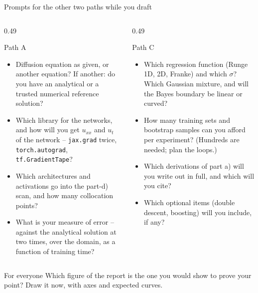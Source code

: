 \documentclass[10pt,aspectratio=169]{beamer}
\begin{document}
\begin{frame}{Prompts for the other two paths while you draft}
\footnotesize
\begin{columns}[T]
\begin{column}{0.49\textwidth}
\begin{block}{Path A}
\begin{itemize}
  \item Diffusion equation as given, or another equation?  If another: do
        you have an analytical or a trusted numerical reference solution?
  \item Which library for the networks, and how will you get $u_{xx}$ and
        $u_t$ of the network -- \texttt{jax.grad} twice, \texttt{torch.autograd},
        \texttt{tf.GradientTape}?
  \item Which architectures and activations go into the part-d) scan, and
        how many collocation points?
  \item What is your measure of error -- against the analytical solution at
        two times, over the domain, as a function of training time?
\end{itemize}
\end{block}
\end{column}
\begin{column}{0.49\textwidth}
\begin{block}{Path C}
\begin{itemize}
  \item Which regression function (Runge 1D, 2D, Franke) and which
        $\sigma$?  Which Gaussian mixture, and will the Bayes boundary be
        linear or curved?
  \item How many training sets and bootstrap samples can you afford per
        experiment?  (Hundreds are needed; plan the loops.)
  \item Which derivations of part a) will you write out in full, and which
        will you cite?
  \item Which optional items (double descent, boosting) will you include,
        if any?
\end{itemize}
\end{block}
\end{column}
\end{columns}
\begin{block}{For everyone}
Which figure of the report is the one you would show to prove your point?
Draw it now, with axes and expected curves.
\end{block}
\end{frame}
\end{document}
